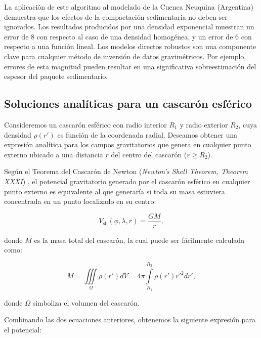 La aplicación de este algoritmo al modelado de la Cuenca Neuquina (Argentina)
demuestra que los efectos de la compactación sedimentaria no deben ser
ignorados.
Los resultados producidos por una densidad exponencial muestran un error de
8\mGal{} con respecto al caso de una densidad homogénea, y un error de 6\mGal{}
con respecto a una función lineal.
Los modelos directos robustos son una componente clave para cualquier método de
inversión de datos gravimétricos.
Por ejemplo, errores de esta magnitud pueden resultar en una significativa
sobreestimación del espesor del paquete sedimentario.



\begin{subappendices}

\section{Soluciones analíticas para un cascarón esférico}
\label{sec:shell}

Consideremos un cascarón esférico con radio interior $R_1$ y radio exterior
$R_2$, cuya densidad $\rho(r')$ es función de la coordenada radial.
Deseamos obtener una expresión analítica para los campos gravitatorios que
genera en cualquier punto externo ubicado a una distancia $r$ del centro del
cascarón ($r \geq R_2$).

Según el Teorema del Cascarón de Newton (\emph{Newton's Shell Theorem, Theorem
XXXI}) \citep{chandrasekhar1995, binney2008}, el potencial gravitatorio
generado por el cascarón esférico en cualquier punto externo es equivalente
al que generaría si toda su masa estuviera concentrada en un punto localizado
en su centro:

\begin{equation}
    V_\text{sh}(\phi, \lambda, r) = \frac{GM}{r},
\end{equation}

\noindent donde $M$ es la masa total del cascarón, la cual puede ser fácilmente
calculada como:

\begin{equation}
    M =
    \iiint\limits_{\Omega} \rho(r') dV =
    4\pi \int\limits_{R_1}^{R_2} \rho(r') {r'}^2 dr',
\end{equation}

\noindent donde $\Omega$ simboliza el volumen del cascarón.

Combinando las dos ecuaciones anteriores, obtenemos la siguiente expresión para
el potencial:


\end{subappendices}
